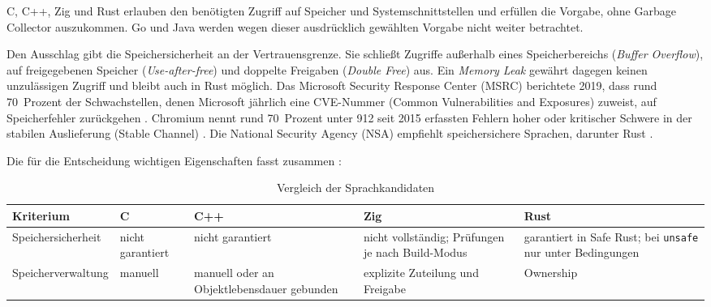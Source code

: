 C, C++, Zig und Rust erlauben den benötigten Zugriff auf Speicher und System\-schnittstellen und
erfüllen die Vorgabe, ohne Garbage Collector auszukommen. Go und Java werden wegen dieser ausdrücklich
gewählten Vorgabe nicht weiter betrachtet.

Den Ausschlag gibt die Speicher\-sicherheit an der Vertrauensgrenze. Sie schließt Zugriffe außerhalb eines
Speicher\-bereichs (\textit{Buffer Overflow}), auf freigegebenen Speicher (\textit{Use-after-free}) und doppelte
Freigaben (\textit{Double Free}) aus. Ein \textit{Memory Leak} gewährt dagegen keinen unzulässigen Zugriff und bleibt
auch in Rust möglich. Das Microsoft Security Response Center (MSRC) berichtete 2019, dass rund 70~Prozent der
Schwachstellen, denen Microsoft jährlich eine CVE-Nummer (Common Vul\-ner\-a\-bil\-i\-ties and Exposures) zuweist, auf
Speicher\-fehler zurückgehen \cite{msrc-memory-blog}. Chromium nennt rund 70~Prozent unter 912 seit 2015 erfassten
Fehlern hoher oder kritischer Schwere in der stabilen Auslieferung (Stable Channel) \cite{chromium-memory}. Die National
Security Agency (NSA) empfiehlt speichersichere Sprachen, darunter Rust \cite{nsa-memory-safety}.

Die für die Entscheidung wichtigen Eigenschaften fasst  zusammen
\cite{iso-c,cpp-core-guidelines,zig-lang,rust-book}:

\begin{table}[H]
  \centering
  \caption{Vergleich der Sprachkandidaten}
  \label{tab:sprachvergleich}
  \footnotesize
  \begin{tabularx}{\textwidth}{@{}L{2.7cm}YYYY@{}}
    \toprule
    \textbf{Kriterium} & \textbf{C} & \textbf{C++} & \textbf{Zig} & \textbf{Rust} \\
    \midrule
    Speicher\-sicherheit & nicht garantiert & nicht garantiert & nicht vollständig; Prüfungen je nach
      Build-Modus & garantiert in Safe Rust; bei \texttt{unsafe} nur unter Bedingungen \\
    Speicher\-verwaltung & manuell & manuell oder an Objekt\-lebens\-dauer gebunden & explizite Zuteilung
      und Freigabe & Ownership \\
    \bottomrule
  \end{tabularx}
\end{table}

